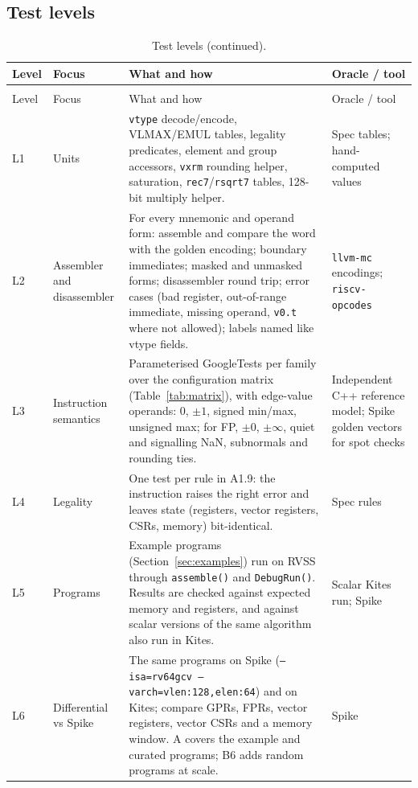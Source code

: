 \documentclass[11pt]{article}
\begin{document}
\subsection{Test levels}

\small
\begin{longtable}{@{}L{0.9cm}L{2.7cm}L{7.8cm}L{2.9cm}@{}}
\caption{Test levels.}\label{tab:levels}\\
\toprule
Level & Focus & What and how & Oracle / tool \\
\midrule
\endfirsthead
\caption[]{Test levels (continued).}\\
\toprule
Level & Focus & What and how & Oracle / tool \\
\midrule
\endhead
L1 & Units & \texttt{vtype} decode/encode, VLMAX/EMUL tables, legality predicates, element and group accessors, \texttt{vxrm} rounding helper, saturation, \texttt{rec7}/\texttt{rsqrt7} tables, 128-bit multiply helper. & Spec tables; hand-computed values \\
L2 & Assembler and disassembler & For every mnemonic and operand form: assemble and compare the word with the golden encoding; boundary immediates; masked and unmasked forms; disassembler round trip; error cases (bad register, out-of-range immediate, missing operand, \texttt{v0.t} where not allowed); labels named like vtype fields. & \texttt{llvm-mc}~\cite{llvm} encodings; \texttt{riscv-opcodes}~\cite{opcodes} \\
L3 & Instruction semantics & Parameterised GoogleTests per family over the configuration matrix (Table~\ref{tab:matrix}), with edge-value operands: 0, $\pm1$, signed min/max, unsigned max; for FP, $\pm0$, $\pm\infty$, quiet and signalling NaN, subnormals and rounding ties. & Independent C++ reference model; Spike golden vectors for spot checks \\
L4 & Legality & One test per rule in A1.9: the instruction raises the right error and leaves state (registers, vector registers, CSRs, memory) bit-identical. & Spec rules \\
L5 & Programs & Example programs (Section~\ref{sec:examples}) run on RVSS through \texttt{assemble()} and \texttt{DebugRun()}. Results are checked against expected memory and registers, and against scalar versions of the same algorithm also run in Kites. & Scalar Kites run; Spike \\
L6 & Differential vs Spike & The same programs on Spike (\texttt{--isa=rv64gcv --varch=vlen:128,elen:64}) and on Kites; compare GPRs, FPRs, vector registers, vector CSRs and a memory window. A covers the example and curated programs; B6 adds random programs at scale. & Spike~\cite{spike} \\

\end{longtable}
\end{document}
